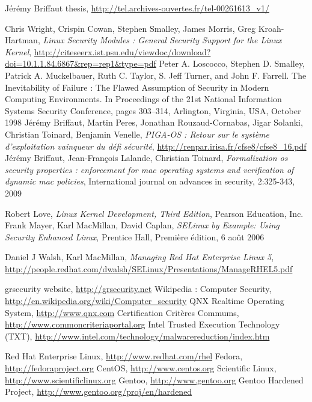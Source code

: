 \documentclass[pdftex,a4paper,titlepage,11pt]{article}
\begin{document}

\begin{thebibliography}{40}

 Jérémy Briffaut thesis, \url{http://tel.archives-ouvertes.fr/tel-00261613_v1/}

 Chris Wright, Crispin Cowan, Stephen Smalley, James Morris, Greg Kroah-Hartman, \textit{Linux Security Modules : General Security Support for the Linux Kernel}, \url{http://citeseerx.ist.psu.edu/viewdoc/download?doi=10.1.1.84.6867&rep=rep1&type=pdf}
 Peter A. Loscocco, Stephen D. Smalley, Patrick A. Muckelbauer, Ruth C. Taylor, S. Jeff Turner, and John F. Farrell. The Inevitability of Failure : The Flawed Assumption of Security in Modern Computing Environments. In Proceedings of the 21st National Information Systems Security Conference, pages 303–314, Arlington, Virginia, USA, October 1998
 Jérémy Briffaut, Martin Peres, Jonathan Rouzaud-Cornabas, Jigar Solanki, Christian Toinard, Benjamin Venelle, \textit{PIGA-OS : Retour sur le système d'exploitation vainqueur du défi sécurité}, \url{http://renpar.irisa.fr/cfse8/cfse8_16.pdf}
 Jérémy Briffaut, Jean-François Lalande, Christian Toinard, \textit{Formalization os security properties : enforcement for mac operating systems and verification of dynamic mac policies}, International journal on advances in security, 2:325-343, 2009

 Robert Love, \textit{Linux Kernel Development, Third Edition}, Pearson Education, Inc.
 Frank Mayer, Karl MacMillan, David Caplan, \textit{SELinux by Example: Using Security Enhanced Linux}, Prentice Hall, Première édition, 6 août 2006

 Daniel J Walsh, Karl MacMillan, \textit{Managing Red Hat Enterprise Linux 5}, \url{http://people.redhat.com/dwalsh/SELinux/Presentations/ManageRHEL5.pdf}

 grsecurity website, \url{http://grsecurity.net}
 Wikipedia : Computer Security, \url{http://en.wikipedia.org/wiki/Computer_security}
 QNX Realtime Operating System, \url{http://www.qnx.com}
 Certification Critères Commums, \url{http://www.commoncriteriaportal.org}
 Intel Trusted Execution Technology (TXT), \url{http://www.intel.com/technology/malwarereduction/index.htm}

 Red Hat Enterprise Linux, \url{http://www.redhat.com/rhel}
 Fedora, \url{http://fedoraproject.org}
 CentOS, \url{http://www.centos.org}
 Scientific Linux, \url{http://www.scientificlinux.org}
 Gentoo, \url{http://www.gentoo.org}
 Gentoo Hardened Project, \url{http://www.gentoo.org/proj/en/hardened}

\end{thebibliography}
\end{document}
